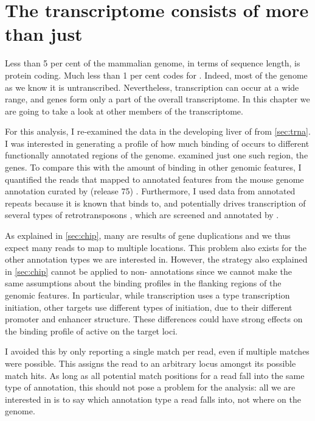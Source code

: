 \chapter{The  transcriptome consists of more than just }
\label{sec:pol3}

Less than \num{5} per cent of the mammalian genome, in terms of sequence length,
is protein coding. Much less than \num{1} per cent codes for \trna[s]. Indeed,
most of the genome as we know it is untranscribed\todo[ref]{}. Nevertheless,
 transcription can occur at a wide range, and \trna genes form only a part
of the overall  transcriptome. In this chapter we are going to take a look
at other members of the  transcriptome.

For this analysis, I re-examined the \chipseq data in the developing liver of
\mmu from \cref{sec:trna}. I was interested in generating a profile of how much
binding of  occurs to different functionally annotated regions of the
genome.  examined just one such region, the \trna genes. To
compare this with the amount of binding in other genomic features, I quantified
the \chipseq reads that mapped to annotated features from the 
mouse genome annotation curated by  (release \num{75})
\citep{Flicek:2014}. Furthermore, I used data from annotated repeats because it
is known that  binds to, and potentially drives transcription of several
types of retrotransposons \citep{Carriere:2012}, which are screened and
annotated by  \citep{Smit:2014}.

As explained in \cref{sec:chip}, many \trna[s] are results of gene duplications
and we thus expect many reads to map to multiple locations. This problem also
exists for the other annotation types we are interested in. However, the
strategy also explained in \cref{sec:chip} cannot be applied to non-\trna
annotations since we cannot make the same assumptions about the binding
profiles in the flanking regions of the genomic features. In particular, while
\trna transcription uses a type  transcription initiation, other
 targets use different types of initiation, due to their different promoter
and enhancer structure. These differences could have strong effects on the
binding profile of active  on the target loci.

I avoided this by only reporting a single match per read, even if multiple
matches were possible. This assigns the read to an arbitrary locus amongst its
possible match hits. As long as all potential match positions for a read fall
into the same type of annotation, this should not pose a problem for the
analysis: all we are interested in is to say which annotation type a read falls
into, not where on the genome.

